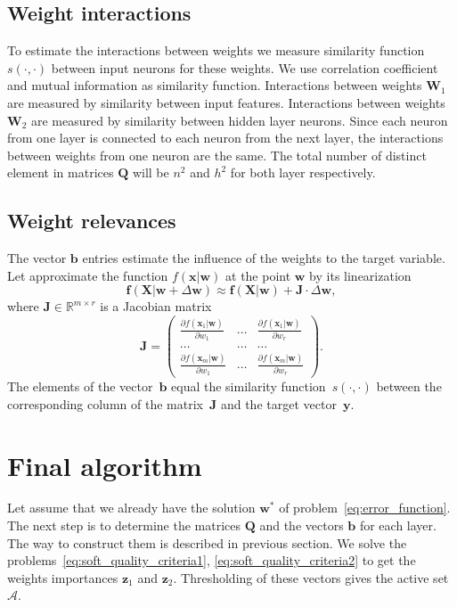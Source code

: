\documentclass[a4paper,12pt]{article}
\theoremstyle{plain} %
\theoremstyle{definition} %
\theoremstyle{remark} %
\newcommand{\bb}{\mathbf{b}}
\newcommand{\bw}{\mathbf{w}}
\newcommand{\bQ}{\mathbf{Q}}
\newcommand{\bW}{\mathbf{W}}
\newcommand{\by}{\mathbf{y}}
\newcommand{\bx}{\mathbf{x}}
\newcommand{\bz}{\mathbf{z}}
\newcommand{\bX}{\mathbf{X}}
\newcommand{\cA}{\mathcal{A}}
\newcommand{\bbR}{\mathbb{R}}
\begin{document}
	\subsection*{Weight interactions}
	To estimate the interactions between weights we measure similarity function $s(\cdot, \cdot)$ between input neurons for these weights. 
	We use correlation coefficient and mutual information as similarity function.
	Interactions between weights $\bW_1$ are measured by similarity between input features. 
	Interactions between weights $\bW_2$ are measured by similarity between hidden layer neurons.
	Since each neuron from one layer is connected to each neuron from the next layer, the interactions between weights from one neuron are the same.
	The total number of distinct element in matrices $\bQ$ will be $n^2$ and $h^2$ for both layer respectively.
	
	\subsection*{Weight relevances}
	
	The vector $\bb$ entries estimate the influence of the weights to the target variable. Let approximate the function $f(\bx | \bw)$ at the point $\bw$ by its linearization
	\begin{equation}
		\mathbf{f} (\bX | \bw + \Delta \bw) \approx \mathbf{f}(\bX | \bw) + \mathbf{J} \cdot \Delta \bw,
	\end{equation}
	where $\mathbf{J} \in \bbR^{m \times r}$ is a Jacobian matrix
	\begin{equation}
		\mathbf{J} = 
		\begin{pmatrix}
			\frac{\partial f(\bx_1 | \bw)}{\partial w_1} & \dots & 
			\frac{\partial f(\bx_1 | \bw)}{\partial w_r} \\
			\dots & \dots & \dots \\
			\frac{\partial f(\bx_m | \bw)}{\partial w_1} & \dots & 
			\frac{\partial f(\bx_m | \bw)}{\partial w_r}
		\end{pmatrix}.
	\end{equation}
	The elements of the vector~$\bb$ equal the similarity function~$s(\cdot, \cdot)$ between the corresponding column of the matrix~$\mathbf{J}$ and the target vector~$\by$.
	
	\section{Final algorithm}
	Let assume that we already have the solution $\bw^*$ of problem~\ref{eq:error_function}.
	The next step is to determine the matrices $\bQ$ and the vectors $\bb$ for each layer. The way to construct them is described in previous section. 
	We solve the problems~\ref{eq:soft_quality_criteria1}, \ref{eq:soft_quality_criteria2} to get the weights importances $\bz_1$ and $\bz_2$. 
	Thresholding of these vectors gives the active set $\cA$.
	
\end{document}
